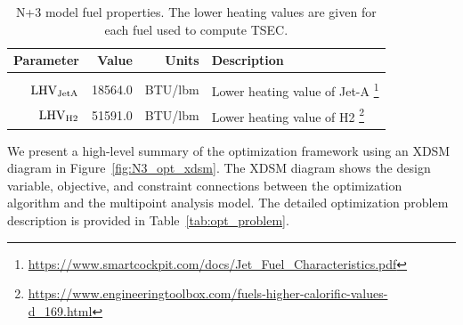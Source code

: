 \documentclass[conf]{new-aiaa}
\begin{document}
\begin{table}[hbt!]
  \centering
  \caption{
    N+3 model fuel properties.
    The lower heating values are given for each fuel used to compute TSEC.}
  \begin{tabular}{r r r l}
    \hline
    Parameter              & Value   & Units        & Description                                                                                                            \\
    \hline                                                                                                                                                                   \\
    $\rm{LHV}_{\rm{JetA}}$ & 18564.0 & \si{BTU/lbm} & Lower heating value of Jet-A \footnote{\url{https://www.smartcockpit.com/docs/Jet_Fuel_Characteristics.pdf}}           \\
    $\rm{LHV}_{\rm{H2}}$   & 51591.0 & \si{BTU/lbm} & Lower heating value of H2 \footnote{\url{https://www.engineeringtoolbox.com/fuels-higher-calorific-values-d_169.html}} \\
    \hline
  \end{tabular}
  \label{fuel_props}
\end{table}

We present a high-level summary of the optimization framework using an XDSM diagram in Figure~\ref{fig:N3_opt_xdsm}.
The XDSM diagram shows the design variable, objective, and constraint connections between the optimization algorithm and the multipoint analysis model.
The detailed optimization problem description is provided in Table~\ref{tab:opt_problem}.
\end{document}
